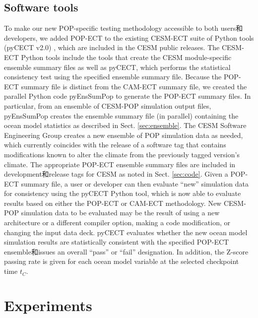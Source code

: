\subsection{Software tools}

To make our new POP-specific testing methodology accessible to both users和developers, we added POP-ECT to the existing CESM-ECT suite of Python tools (pyCECT v2.0) , which are included in the CESM public releases. The CESM-ECT Python tools include the tools that create the CESM module-specific ensemble summary files as well as pyCECT, which performs the statistical consistency test using the specified ensemble summary file.  Because the POP-ECT summary file is distinct from the CAM-ECT summary file, we created the parallel Python code pyEnsSumPop to generate the POP-ECT summary files.  In particular, from an ensemble of CESM-POP simulation output files, pyEnsSumPop creates the ensemble summary file (in parallel) containing the ocean model statistics as described in Sect. \ref{sec:ensemble}.  The CESM Software Engineering Group creates a new ensemble of POP simulation data as needed, which currently coincides with the release of a software tag that contains modifications known to alter the climate from the previously tagged version's climate.  The appropriate POP-ECT ensemble summary files are included in development和release tags for CESM as noted in Sect. \ref{sec:code}.  Given a POP-ECT summary file, a user or developer can then evaluate ``new'' simulation data for consistency using the pyCECT Python tool, which is now able to evaluate results based on either the POP-ECT or CAM-ECT methodology.  New CESM-POP simulation data to be evaluated may be the result of using a new architecture or a different compiler option, making a code modification, or changing the input data deck.  pyCECT evaluates whether the new ocean model simulation results are statistically consistent with the specified POP-ECT ensemble和issues an overall ``pass'' or ``fail'' designation.  In addition, the Z-score passing rate is given for each ocean model variable at the selected checkpoint time $t_C$.


\section{Experiments} \label{sec:exp}

